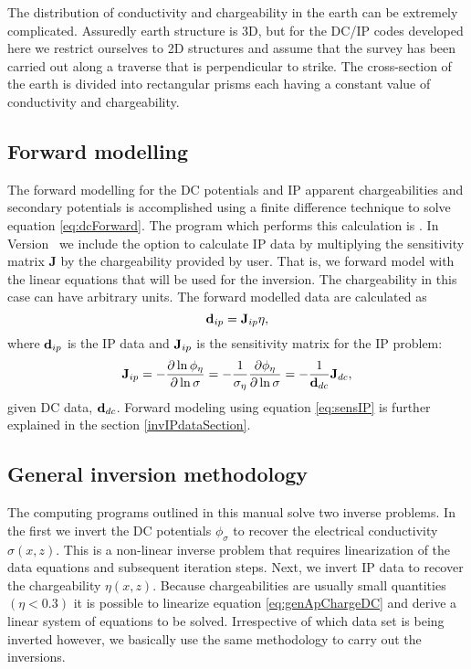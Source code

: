 The distribution of conductivity and chargeability in the earth can be extremely complicated. Assuredly earth structure is 3D, but for the DC/IP codes developed here we restrict ourselves to 2D structures and assume that the survey has been carried out along a traverse that is perpendicular to strike. The cross-section of the earth is divided into rectangular prisms each having a constant value of conductivity and chargeability. 

\subsection{Forward modelling}
The forward modelling for the DC potentials and IP apparent chargeabilities and secondary potentials is accomplished using a finite difference technique to solve equation \ref{eq:dcForward}. The program which performs this calculation is . In Version \version~we include the option to calculate IP data by multiplying the sensitivity matrix $\mathbf{J}$ by the chargeability provided by user. That is, we forward model with the linear equations that will be used for the inversion. The chargeability in this case can have arbitrary units. The forward modelled data are calculated as
%
\begin{equation}
\mathbf{d}_{ip} = \mathbf{J}_{ip}\eta,
\end{equation}
where $\mathbf{d}_{ip}$ is the IP data and $\mathbf{J}_{ip}$ is the sensitivity matrix for the IP problem:
\begin{equation}
\mathbf{J}_{ip} = -\frac{\partial \ln\phi_\eta}{\partial \ln\sigma} = -\frac{1}{\sigma_\eta}\frac{\partial\phi_\eta}{\partial \ln\sigma} = -\frac{1}{\mathbf{d}_{dc}}\mathbf{J}_{dc},
\label{eq:sensIP}
\end{equation}
given DC data, $\mathbf{d}_{dc}$. Forward modeling using equation \ref{eq:sensIP} is further explained in the section \ref{invIPdataSection}.

\subsection{General inversion methodology}
The computing programs outlined in this manual solve two inverse problems. In the first we invert the DC potentials $\phi_\sigma$ to recover the electrical conductivity $\sigma(x,z)$. This is a non-linear inverse problem that requires linearization of the data equations and subsequent iteration steps. Next, we invert IP data to recover the chargeability $\eta(x,z)$. Because chargeabilities are usually small quantities $(\eta < 0.3)$ it is possible to linearize equation \ref{eq:genApChargeDC} and derive a linear system of equations to be solved. Irrespective of which data set is being inverted however, we basically use the same methodology to carry out the inversions.

